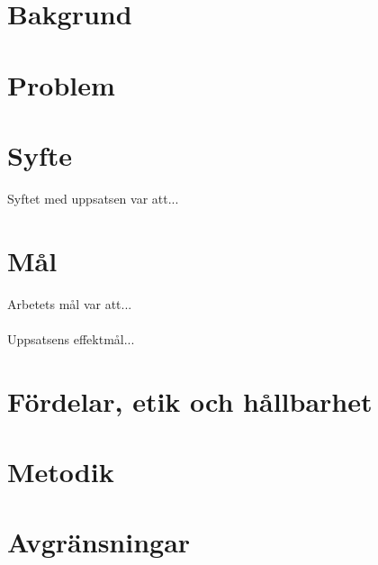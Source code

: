 

\section{Bakgrund}



\section{Problem}\label{sec:problem}


\section{Syfte}
Syftet med uppsatsen var att...

\section{Mål}
Arbetets mål var att...
\\\\
Uppsatsens effektmål...

\section{Fördelar, etik och hållbarhet}


\section{Metodik}

\section{Avgränsningar}\label{sec:avgr}



